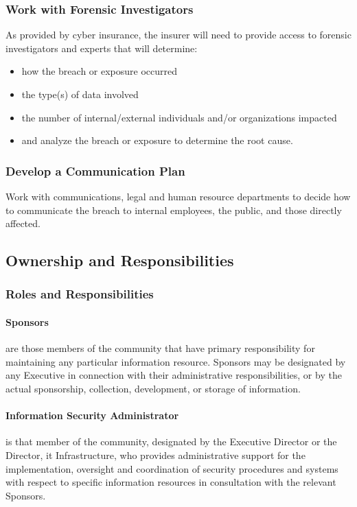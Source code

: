 \subsubsection{Work with Forensic Investigators}
As provided by \OrganizationName{} cyber insurance, the insurer will need to provide access to forensic investigators and experts that will determine:
\begin{itemize}
\item
how the breach or exposure occurred
\item
the type(s) of data involved
\item
the number of internal/external individuals and/or organizations impacted
\item
and analyze the breach or exposure to determine the root cause.
\end{itemize}

\subsubsection{Develop a Communication Plan}
Work with \OrganizationName{} communications, legal and human resource departments to decide how to communicate the breach to internal employees, the public, and those directly affected.

\subsection{Ownership and Responsibilities}
\subsubsection{Roles and Responsibilities}
\paragraph{Sponsors} are those members of the \OrganizationName{} community that have primary responsibility for maintaining any particular information resource.  
Sponsors may be designated by any \OrganizationName{} Executive in connection with their administrative responsibilities, or by the actual sponsorship, collection, development, or storage of information.
\paragraph{Information Security Administrator} is that member of the \OrganizationName{} community, designated by the Executive Director or the Director, \gls{it} Infrastructure, who provides administrative support for the implementation, oversight and coordination of security procedures and systems with respect to specific information resources in consultation with the relevant Sponsors.
